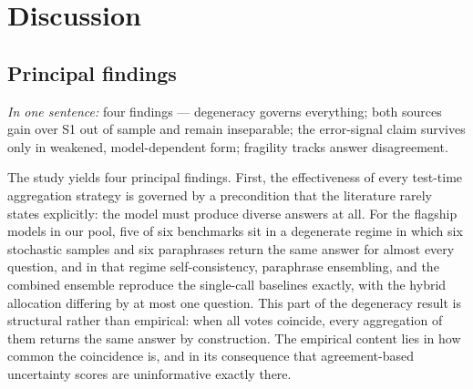\section{Discussion}
\label{sec:discussion}

\subsection{Principal findings}

\emph{In one sentence:} four findings --- degeneracy governs everything; both sources gain over S1 out of sample and remain inseparable; the error-signal claim survives only in weakened, model-dependent form; fragility tracks answer disagreement.

The study yields four principal findings. First, the effectiveness of every test-time aggregation strategy is governed by a precondition that the literature rarely states explicitly: the model must produce diverse answers at all. For the flagship models in our pool, five of six benchmarks sit in a degenerate regime in which six stochastic samples and six paraphrases return the same answer for almost every question, and in that regime self-consistency, paraphrase ensembling, and the combined ensemble reproduce the single-call baselines exactly, with the hybrid allocation differing by at most one question. This part of the degeneracy result is structural rather than empirical: when all votes coincide, every aggregation of them returns the same answer by construction. The empirical content lies in how common the coincidence is, and in its consequence that agreement-based uncertainty scores are uninformative exactly there.

